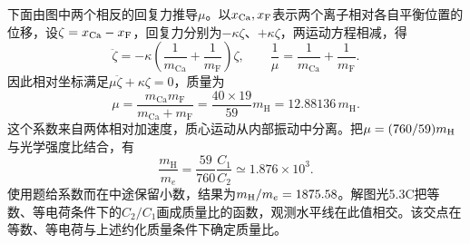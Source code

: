 \documentclass[UTF8,fontset=fandol,a4paper,11pt]{ctexart}
\begin{document}
下面由图中两个相反的回复力推导$\mu$。以$x_{\rm Ca},x_{\rm F}$表示两个离子相对各自平衡位置的位移，设$\zeta=x_{\rm Ca}-x_{\rm F}$，回复力分别为$-\kappa\zeta$、$+\kappa\zeta$，两运动方程相减，得
\[
\ddot\zeta=-\kappa\left(\frac1{m_{\mathrm{Ca}}}
+\frac1{m_{\mathrm F}}\right)\zeta,\qquad
\frac1\mu=\frac1{m_{\mathrm{Ca}}}+\frac1{m_{\mathrm F}}.
\]
因此相对坐标满足$\mu\ddot\zeta+\kappa\zeta=0$，质量为
\[
\mu=\frac{m_{\mathrm{Ca}}m_{\mathrm F}}{m_{\mathrm{Ca}}+m_{\mathrm F}}
=\frac{40\times19}{59}m_{\mathrm H}
=12.88136\,m_{\mathrm H}.
\]
这个系数来自两体相对加速度，质心运动从内部振动中分离。把$\mu=(760/59)m_{\rm H}$与光学强度比结合，有
\[
\boxed{\frac{m_{\mathrm H}}{m_e}
=\frac{59}{760}\frac{C_1}{C_2}
\simeq1.876\times10^3}.
\]
使用题给系数而在中途保留小数，结果为$m_{\rm H}/m_e=1875.58$。解图光5.3C把等数、等电荷条件下的$C_2/C_1$画成质量比的函数，观测水平线在此值相交。该交点在等数、等电荷与上述约化质量条件下确定质量比。
\end{document}

